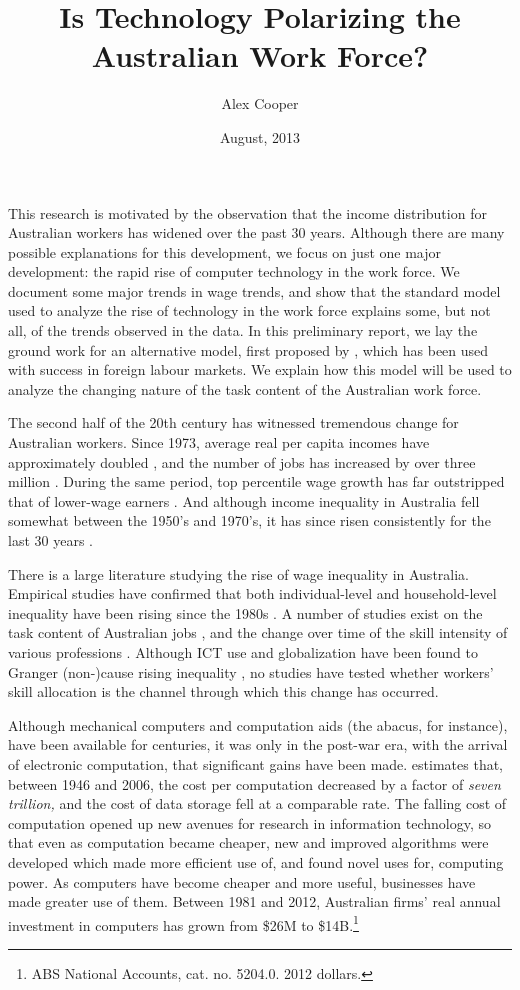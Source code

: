 \documentclass[a4paper,11pt]{article}
\title{Is Technology Polarizing the Australian Work Force?}
\author{Alex Cooper}
\date{August, 2013}
\begin{document}
\maketitle

This research is motivated by the observation that the income distribution for Australian workers has widened over the past 30 years. Although there are many possible explanations for this development, we focus on just one major development: the rapid rise of computer technology in the work force. We document some major trends in wage trends, and show that the standard model used to analyze the rise of technology in the work force explains some, but not all, of the trends observed in the data. In this preliminary report, we lay the ground work for an alternative model, first proposed by \citet{Levy2003}, which has been used with success in foreign labour markets. We explain how this model will be used to analyze the changing nature of the task content of the Australian work force.

The second half of the 20th century has witnessed tremendous change for Australian workers. Since 1973, average real per capita incomes have approximately doubled \citep{NA20124}, and the number of jobs has increased by over three million \citep{LFSApr2013}. During the same period, top percentile wage growth has far outstripped that of lower-wage earners \citep{Atkinson1997,Borland1999}. And although income inequality in Australia fell somewhat between the 1950's and 1970's, it has since risen consistently for the last 30 years \citep{Leigh2005,Gaston2009}.

There is a large literature studying the rise of wage inequality in Australia. Empirical studies have confirmed that both individual-level and household-level inequality have been rising since the 1980s \citep{Borland1999,Leigh2005,Gaston2009}. A number of studies exist on the task content of Australian jobs \citep{Esposto2012a}, and the change over time of the skill intensity of various professions \citep{Esposto2012, Esposto2012a}. Although ICT use and globalization have been found to Granger (non-)cause rising inequality \citep{Gaston2009}, no studies have tested whether workers' skill allocation is the channel through which this change has occurred.

Although mechanical computers and computation aids (the abacus, for instance), have been available for centuries, it was only in the post-war era, with the arrival of electronic computation, that significant gains have been made. \citet{Nordhaus2007} estimates that, between 1946 and 2006, the cost per computation decreased by a factor of {\em seven trillion,} and the cost of data storage fell at a comparable rate. The falling cost of computation opened up new avenues for research in information technology, so that even as computation became cheaper, new and improved algorithms were developed which made more efficient use of, and found novel uses for, computing power. As computers have become cheaper and more useful, businesses have made greater use of them. Between 1981 and 2012, Australian firms' real annual investment in computers has grown from \$26M to \$14B.\footnote{ABS National Accounts, cat. no. 5204.0. 2012 dollars.}
\end{document}
